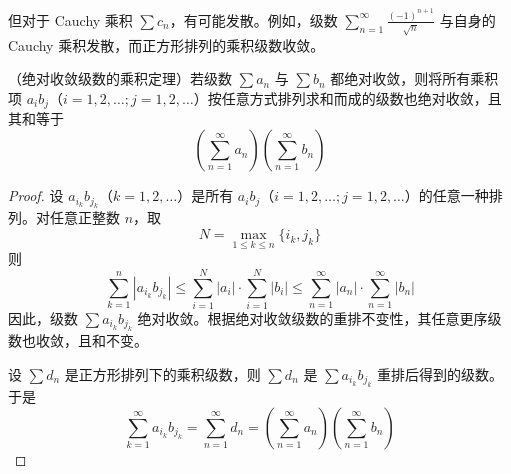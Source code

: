 但对于 Cauchy 乘积 $\sum c_n$，有可能发散。例如，级数 $\displaystyle \sum_{n=1}^{\infty} \frac{(-1)^{n+1}}{\sqrt{n}}$ 与自身的 Cauchy 乘积发散，而正方形排列的乘积级数收敛。
\begin{proposition}
	（绝对收敛级数的乘积定理）若级数 $\sum a_n$ 与 $\sum b_n$ 都绝对收敛，则将所有乘积项 $a_i b_j$（$i=1,2,\dots; j=1,2,\dots$）按任意方式排列求和而成的级数也绝对收敛，且其和等于
	\[
	\left( \sum_{n=1}^{\infty} a_n \right) \left( \sum_{n=1}^{\infty} b_n \right)
	\]
\end{proposition}
\begin{proof}
	设 $a_{i_k} b_{j_k}$（$k=1,2,\dots$）是所有 $a_i b_j$（$i=1,2,\dots; j=1,2,\dots$）的任意一种排列。对任意正整数 $n$，取
	\[
	N = \max_{1 \le k \le n} \{i_k, j_k\}
	\]
	则
	\[
	\sum_{k=1}^n |a_{i_k} b_{j_k}| \le \sum_{i=1}^N |a_i| \cdot \sum_{i=1}^N |b_i| \le \sum_{n=1}^{\infty} |a_n| \cdot \sum_{n=1}^{\infty} |b_n|
	\]
	因此，级数 $\sum a_{i_k} b_{j_k}$ 绝对收敛。根据绝对收敛级数的重排不变性，其任意更序级数也收敛，且和不变。
	
	设 $\sum d_n$ 是正方形排列下的乘积级数，则 $\sum d_n$ 是 $\sum a_{i_k} b_{j_k}$ 重排后得到的级数。于是
	\[
	\sum_{k=1}^{\infty} a_{i_k} b_{j_k} = \sum_{n=1}^{\infty} d_n = \left( \sum_{n=1}^{\infty} a_n \right) \left( \sum_{n=1}^{\infty} b_n \right)
	\]
\end{proof}

